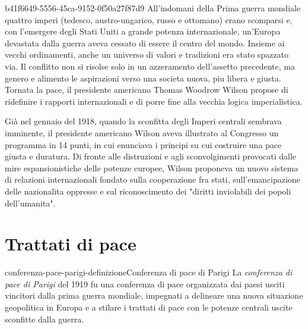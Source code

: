 \documentclass[preview]{standalone}
\begin{document}
\begin{snippet}{b41f6649-5556-45ca-9152-0f50a27f87d9}
    All'indomani della Prima guerra mondiale quattro imperi (tedesco, austro-ungarico, russo e
    ottomano) erano scomparsi e, con l'emergere degli Stati Uniti a grande potenza internazionale,
    un'Europa devastata dalla guerra aveva cessato di essere il centro del mondo. Insieme ai vecchi
    ordinamenti, anche un universo di valori e tradizioni era stato spazzato via. Il conflitto non si
    risolse solo in un azzeramento dell'assetto precedente, ma genero e alimento le aspirazioni
    verso una societa nuova, piu libera e giusta. Tornata la pace, il presidente americano Thomas
    Woodrow Wilson propose di ridefinire i rapporti internazionali e di porre fine alla vecchia
    logica imperialistica.
    
    Già nel gennaio del 1918, quando la sconfitta degli Imperi centrali sembrava imminente, il
    presidente americano Wilson aveva illustrato al Congresso un programma in 14 punti, in cui
    enunciava i principi su cui costruire una pace giusta e duratura. Di fronte alle distruzioni e agli
    sconvolgimenti provocati dalle mire espansionistiche delle potenze europee, Wilson proponeva
    un nuovo sistema di relazioni internazionali fondato sulla cooperazione fra stati,
    sull'emancipazione delle nazionalita oppresse e sul riconoscimento dei "diritti inviolabili dei
    popoli dell'umanita".
    
\end{snippet}

\section{Trattati di pace}

\begin{snippetdefinition}{conferenza-pace-parigi-definizione}{Conferenza di pace di Parigi}
    La \textit{conferenza di pace di Parigi} del 1919 fu una conferenza di
    pace organizzata dai paesi usciti vincitori dalla prima guerra mondiale,
    impegnati a delineare una nuova situazione geopolitica in Europa e a
    stilare i trattati di pace con le potenze centrali uscite sconfitte dalla guerra. 
\end{snippetdefinition}


\end{document}
